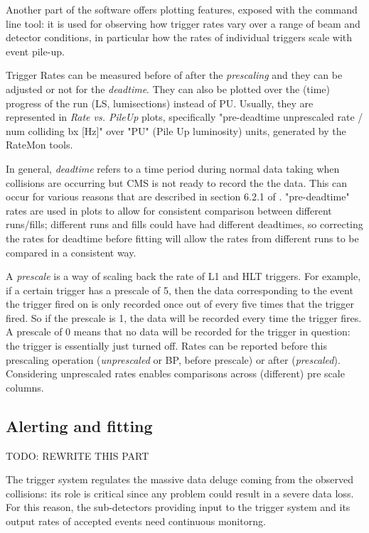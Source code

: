 Another part of the software offers plotting features, exposed with the  command line tool: it is used for observing how trigger rates vary over a range of beam and detector conditions, in particular how the rates of individual triggers scale with event pile-up.

Trigger Rates can be measured before of after the \textit{prescaling} and they can be adjusted or not for the \textit{deadtime}. They can also be plotted over the (time) progress of the run (LS, lumisections) instead of PU. Usually, they are represented in \textit{Rate vs. PileUp} plots, specifically "pre-deadtime unprescaled rate / num colliding bx [Hz]" over "PU" (Pile Up luminosity) units, generated by the RateMon tools.

In general, \textit{deadtime} refers to a time period during normal data taking when collisions are occurring but CMS is not ready to record the the data. This can occur for various reasons that are described in section 6.2.1 of \cite{Khachatryan_2017}. "pre-deadtime" rates are used in plots to allow for consistent comparison between different runs/fills; different runs and fills could have had different deadtimes, so correcting the rates for deadtime before fitting will allow the rates from different runs to be compared in a consistent way.

A \textit{prescale} is a way of scaling back the rate of L1 and HLT triggers. For example, if a certain trigger has a prescale of 5, then the data corresponding to the event the trigger fired on is only recorded once out of every five times that the trigger fired. So if the prescale is 1, the data will be recorded every time the trigger fires. A prescale of 0 means that no data will be recorded for the trigger in question: the trigger is essentially just turned off. Rates can be reported before this prescaling operation (\textit{unprescaled} or BP, before prescale) or after (\textit{prescaled}). Considering unprescaled rates enables comparisons across (different) pre scale columns.

\subsection{Alerting and fitting}

TODO: REWRITE THIS PART

The trigger system regulates the massive data deluge coming from the observed collisions: its role is critical since any problem could result in a severe data loss. For this reason, the sub-detectors providing input to the trigger system and its output rates of accepted events need continuous monitorng.

